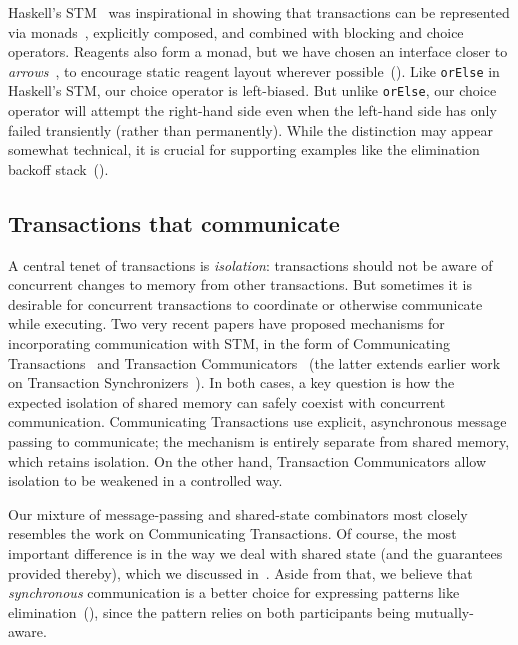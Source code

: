 \documentclass[preprint,nocopyrightspace]{sigplanconf}
\begin{document}
Haskell's STM~\cite{Harris2005a} was inspirational in showing that
transactions can be represented via monads~\cite{PeytonJones1993}, explicitly
composed, and combined with blocking and choice operators.  Reagents also form
a monad, but we have chosen an interface closer to
\emph{arrows}~\cite{Hughes2000}, to encourage static reagent layout wherever
possible~().  Like \lstinline{orElse} in Haskell's STM, our
choice operator is left-biased.  But unlike \lstinline{orElse}, our choice
operator will attempt the right-hand side even when the left-hand side has
only failed transiently (rather than permanently).  While the distinction may
appear somewhat technical, it is crucial for supporting examples like the
elimination backoff stack~().

\subsection{Transactions that communicate}

A central tenet of transactions is \emph{isolation}: transactions should not
be aware of concurrent changes to memory from other transactions.  But
sometimes it is desirable for concurrent transactions to coordinate or
otherwise communicate while executing.  Two very recent papers have proposed
mechanisms for incorporating communication with STM, in the form of
Communicating Transactions~\cite{Lesani2011} and Transaction
Communicators~\cite{Luchangco2011b} (the latter extends earlier work on
Transaction Synchronizers~\cite{Luchangco2005}).  In both cases, a key
question is how the expected isolation of shared memory can safely coexist
with concurrent communication.  Communicating Transactions use explicit,
asynchronous message passing to communicate; the mechanism is entirely
separate from shared memory, which retains isolation.  On the other hand,
Transaction Communicators allow isolation to be weakened in a controlled way.

Our mixture of message-passing and shared-state combinators most closely
resembles the work on Communicating Transactions.  Of course, the most
important difference is in the way we deal with shared state (and the
guarantees provided thereby), which we discussed in~.  Aside from
that, we believe that \emph{synchronous} communication is a better choice for
expressing patterns like elimination~(), since the pattern
relies on both participants being mutually-aware.  %

\end{document}
